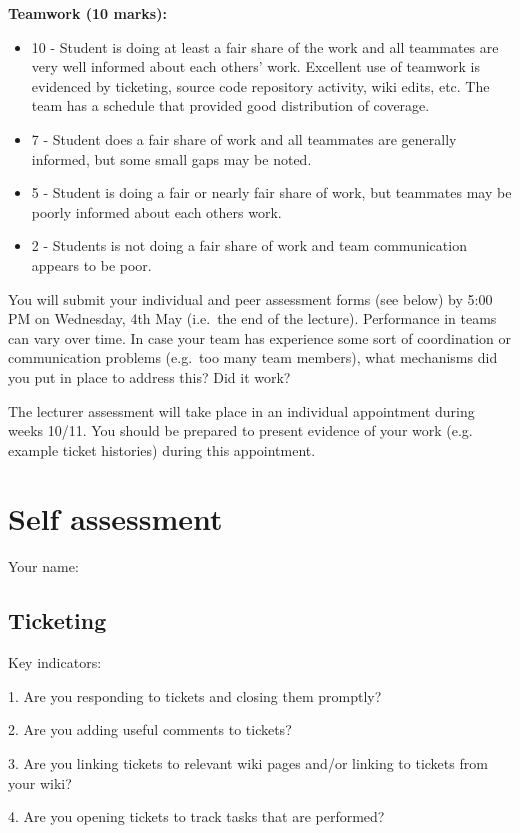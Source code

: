 \documentclass{article}   	%
\begin{document}
\textbf{Teamwork (10 marks):}
\begin{itemize}
  \item 10 - Student is doing at least a fair share of the work and all teammates are very well informed about each others' work.  Excellent use of teamwork is evidenced by ticketing, source code repository activity, wiki edits, etc.  The team has a schedule that provided good distribution of coverage.
  \item 7 -  Student does a fair share of work and all teammates are generally informed, but some small gaps may be noted.
  \item 5 -  Student is doing a fair or nearly fair share of work, but teammates may be poorly informed about each others work.
  \item 2 -  Students is not doing a fair share of work and team communication appears to be poor.
\end{itemize}

You will submit your individual and peer assessment forms (see below) by 5:00 PM on Wednesday, 4th May (i.e.~the end of the lecture). Performance in teams can vary over time. In case your team has experience some sort of coordination or communication problems (e.g.~too many team members), what mechanisms did you put in place to address this? Did it work?

The lecturer assessment will take place in an individual appointment during weeks 10/11.  You should be prepared to present evidence of your work (e.g. example ticket histories) during this appointment.

\newpage

\section*{Self assessment}

Your name: 
\vskip 1cm

\subsection*{Ticketing}

Key indicators: 

1.  Are you responding to tickets and closing them promptly?

2.  Are you adding useful comments to tickets?

3.  Are you linking tickets to relevant wiki pages and/or linking to tickets from your wiki?

4.  Are you opening tickets to track tasks that are performed?
\end{document}
